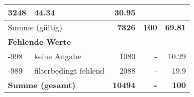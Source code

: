 \begin{longtable}{lXrrr}
       \num{3248} &
       \num[round-mode=places,round-precision=2]{44,34} &
         \num[round-mode=places,round-precision=2]{30,95} \\
     \midrule
     \multicolumn{2}{l}{Summe (gültig)} &
       \textbf{\num{7326}} &
     \textbf{100} &
       \textbf{\num[round-mode=places,round-precision=2]{69,81}} \\
     \multicolumn{5}{l}{\textbf{Fehlende Werte}}\\
       -998 &
       keine Angabe &
         \num{1080} &
        - &
         \num[round-mode=places,round-precision=2]{10,29} \\
       -989 &
       filterbedingt fehlend &
         \num{2088} &
        - &
         \num[round-mode=places,round-precision=2]{19,9} \\
     \midrule
     \multicolumn{2}{l}{\textbf{Summe (gesamt)}} &
          \textbf{\num{10494}} &
        \textbf{-} &
        \textbf{100} \\
     \bottomrule
     \end{longtable}
     
